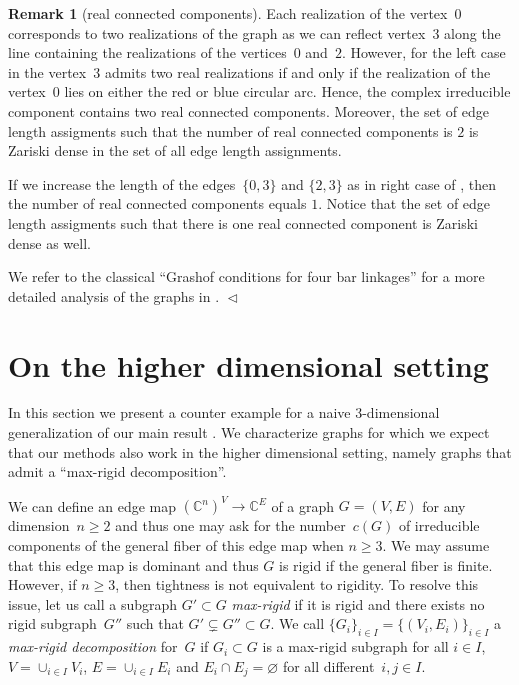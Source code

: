\documentclass[12pt]{article}
\theoremstyle{definition}
\newtheorem{remark}[lemma]{Remark}
\newcommand{\END}{\hfill $\vartriangleleft$}
\newcommand{\df}[1]{{\it #1}}
\newcommand{\st}{such that }
\newcommand{\C}{{\mathbb{C}}}
\begin{document}
\begin{remark}[real connected components]
Each realization of the vertex~$0$
corresponds to two realizations of the graph as we can reflect vertex~$3$
along the line containing the realizations of the vertices~$0$ and~$2$.
However, for the left case in 
the vertex~$3$ admits two real realizations if and only if the realization of the vertex~$0$
lies on either the red or blue circular arc.
Hence, the complex irreducible component contains two real connected components.
Moreover, the set of edge length assigments \st the number of real connected components is $2$
is Zariski dense in the set of all edge length assignments.

If we increase the length of the edges~$\{0,3\}$ and $\{2,3\}$ as in right case of ,
then the number of real connected components equals $1$.
Notice that the set of edge length assigments \st there is one real connected component
is Zariski dense as well.

We refer to the classical ``Grashof conditions for four bar linkages'' for a more detailed analysis
of the graphs in .
\END
\end{remark}

\section{On the higher dimensional setting}
\label{sec:dim}

In this section we present a counter example for a naive 3-dimensional generalization of
our main result . We characterize graphs for which we expect
that our methods also work in the higher dimensional setting, namely
graphs that admit a ``max-rigid decomposition''.

We can define an edge map $(\C^n)^V\to\C^E$ of a graph $G=(V,E)$ for any dimension~$n\geq 2$
and thus one may ask for the number~$c(G)$ of irreducible components
of the general fiber of this edge map when $n\geq 3$.
We may assume that this edge map is dominant and thus
$G$ is rigid if the general fiber is finite.
However, if $n\geq 3$, then tightness is not equivalent to rigidity.
To resolve this issue, let us call a subgraph $G'\subset G$ \df{max-rigid} if it is rigid and there exists
no rigid subgraph~$G''$ \st $G'\subsetneq G''\subset G$.
We call $\{G_i\}_{i\in I}=\{(V_i,E_i)\}_{i\in I}$ a \df{max-rigid decomposition} for~$G$
if $G_i\subset G$ is a max-rigid subgraph for all $i\in I$,
$V=\cup_{i\in I}V_i$, $E=\cup_{i\in I} E_i$
and $E_i\cap E_j=\varnothing$ for all different~$i,j\in I$.
\end{document}

